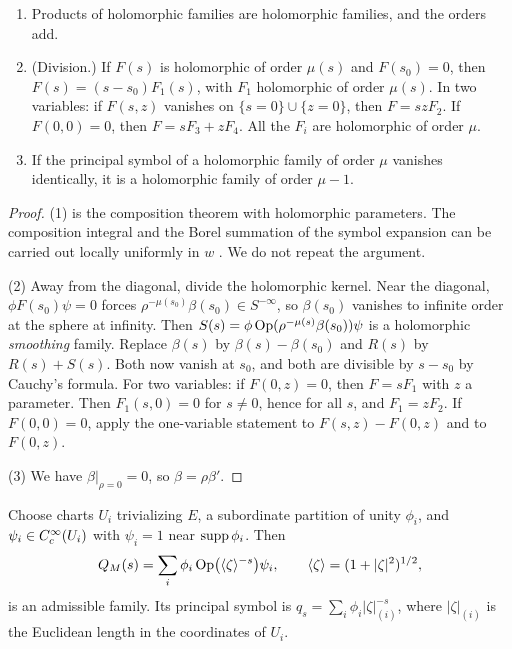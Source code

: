 \begin{lemma}\label{tr:lem:holcalc}
\begin{enumerate}
\item Products of holomorphic families are holomorphic families, and the
orders add.
\item (Division.) If \(F(s)\) is holomorphic of order \(\mu(s)\) and
\(F(s_0)=0\), then \(F(s)=(s-s_0)F_1(s)\), with \(F_1\) holomorphic of order
\(\mu(s)\). In two variables: if \(F(s,z)\) vanishes on \(\{s=0\}\cup
\{z=0\}\), then \(F=szF_2\). If \(F(0,0)=0\), then \(F=sF_3+zF_4\). All
the \(F_i\) are holomorphic of order \(\mu\).
\item If the principal symbol of a holomorphic family of order \(\mu\)
vanishes identically, it is a holomorphic family of order \(\mu-1\).
\end{enumerate}
\end{lemma}

\begin{proof}
(1) is the composition theorem with holomorphic parameters. The composition
integral and the Borel summation of the symbol expansion can be carried out
locally uniformly in \(w\) \cite[Ch.~15]{MelroseMicro}. We do not repeat
the argument.

(2) Away from the diagonal, divide the holomorphic kernel. Near the
diagonal, \(\phi F(s_0)\psi=0\) forces \(\rho^{-\mu(s_0)}\beta(s_0)\in
S^{-\infty}\), so \(\beta(s_0)\) vanishes to infinite order at the sphere at
infinity. Then \(S(s)=\phi\operatorname{Op}(\rho^{-\mu(s)}\beta(s_0))\psi\) is a
holomorphic \emph{smoothing} family. Replace \(\beta(s)\) by
\(\beta(s)-\beta(s_0)\) and \(R(s)\) by \(R(s)+S(s)\). Both now vanish at
\(s_0\), and both are divisible by \(s-s_0\) by Cauchy's formula. For two
variables: if \(F(0,z)=0\), then \(F=sF_1\) with \(z\) a parameter. Then
\(F_1(s,0)=0\) for \(s\ne0\), hence for all \(s\), and \(F_1=zF_2\). If
\(F(0,0)=0\), apply the one-variable statement to \(F(s,z)-F(0,z)\) and to
\(F(0,z)\).

(3) We have \(\beta|_{\rho=0}=0\), so \(\beta=\rho\beta'\).
\end{proof}

\begin{proposition}\label{tr:prop:QM}
Choose charts \(U_i\) trivializing \(E\), a subordinate partition of unity
\(\phi_i\), and \(\psi_i\in C^\infty_c(U_i)\) with \(\psi_i=1\) near
\(\operatorname{supp}\phi_i\). Then
\[
 Q_M(s)=\sum_i\phi_i\operatorname{Op}\bigl(\langle \zeta\rangle^{-s}\bigr)\psi_i ,
 \qquad\langle \zeta\rangle=(1+|\zeta|^2)^{1/2},
\]
is an admissible family. Its principal symbol is
\(q_s=\sum_i\phi_i|\zeta|_{(i)}^{-s}\), where \(|\zeta|_{(i)}\) is the
Euclidean length in the coordinates of \(U_i\).
\end{proposition}

